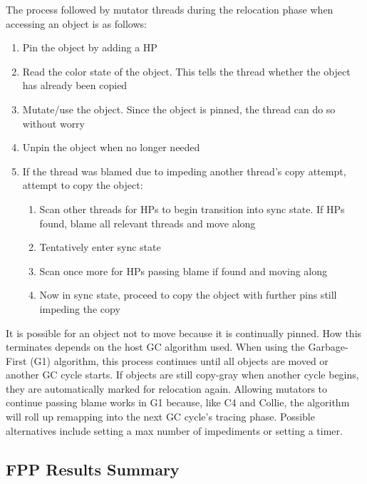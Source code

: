 \documentclass{sig-alternate}
\begin{document}
The process followed by mutator threads during the relocation phase when 
accessing an object is as follows:
\begin{enumerate}
\item Pin the object by adding a HP
\item Read the color state of the object. This tells the thread whether the object
has already been copied
\item Mutate/use the object. Since the object is pinned, the thread can 
do so without worry
\item Unpin the object when no longer needed
\item If the thread was blamed due to impeding another thread's copy attempt, 
attempt to copy the object:
\begin{enumerate}
\item Scan other threads for HPs to begin transition into sync state. If HPs found,
blame all relevant threads and move along
\item Tentatively enter sync state
\item Scan once more for HPs passing blame if found and moving along
\item Now in sync state, proceed to copy the object with further
pins still impeding the copy
\end{enumerate}
\end{enumerate}

It is possible for an
object not to move because it is continually pinned. How this terminates 
depends on the host GC algorithm used. When using the Garbage-First (G1) algorithm,
this process continues until all objects are moved or another GC cycle starts.
If objects are still copy-gray when another cycle begins, they are automatically
marked for relocation again. Allowing mutators to continue passing blame works
in G1 because, like C4 and Collie, the algorithm will roll up remapping into the next
GC cycle's tracing phase. Possible alternatives include setting a max number of impediments
or setting a timer.



\subsection{FPP Results Summary}
\label{sec:fppResults}
\end{document}
